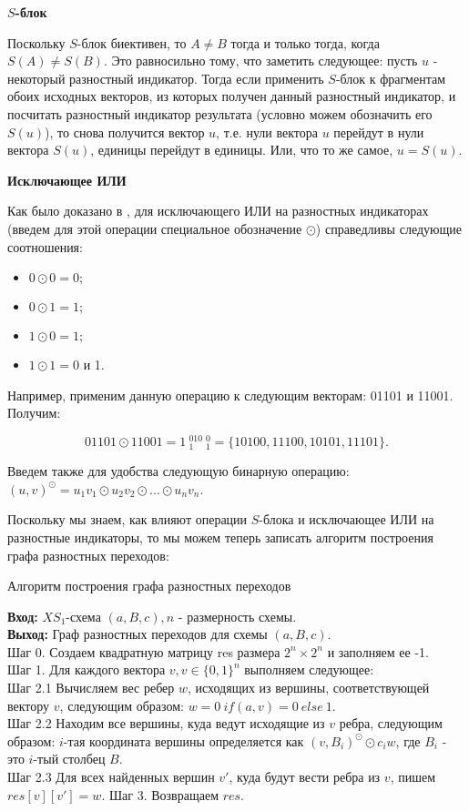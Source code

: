 \documentclass[a4paper,12pt]{report}
\theoremstyle{plain} %
\theoremstyle{definition}
\theoremstyle{remark}
\begin{document}
\begin{large}
\textbf{$S$-блок}

Поскольку $S$-блок биективен, то $A \neq B$ тогда и только тогда, когда $S(A) \neq S(B)$. Это равносильно тому, что заметить следующее: пусть $u$ - некоторый разностный индикатор. Тогда если применить $S$-блок к фрагментам обоих исходных векторов, из которых получен данный разностный индикатор, и посчитать разностный индикатор результата (условно можем обозначить его $S(u)$), то снова получится вектор $u$, т.е. нули вектора $u$ перейдут в нули вектора $S(u)$, единицы перейдут в единицы. Или, что то же самое, $u=S(u)$.

\textbf{Исключающее ИЛИ}

 Как было доказано в \cite{marchuk}, для исключающего ИЛИ на разностных индикаторах (введем для этой операции специальное обозначение $\odot$) справедливы следующие соотношения:

\begin{itemize}
\item $0 \odot 0 = 0;$
\item $0 \odot 1 = 1;$
\item $1 \odot 0= 1;$
\item $1 \odot 1 = 0$ и 1. 
\end{itemize}

Например, применим данную операцию к следующим векторам: 01101 и 11001. Получим:

$$01101 \odot 11001 = 1~_{1}^010~_{1}^0 = \{10100, 11100, 10101, 11101\}.$$

Введем также для удобства следующую бинарную операцию: $(u, v)^{\odot} = u_1v_1 \odot u_2v_2 \odot ... \odot u_nv_n$.

Поскольку мы знаем, как влияют операции $S$-блока и исключающее ИЛИ на разностные индикаторы, то мы можем теперь записать алгоритм построения графа разностных переходов:

\begin{algorithm}[H]
\caption{Алгоритм построения графа разностных переходов}
\label{diff_graph_construct}
\textbf{Вход:} $XS_1$-схема $(a, B, c), n$ - размерность схемы.\\
\textbf{Выход:} Граф разностных переходов для схемы $(a, B, c)$.\\
Шаг 0. Создаем квадратную матрицу res размера $2^n \times 2^n$ и заполняем ее -1. \\
Шаг 1. Для каждого вектора $v, v \in \{0, 1\}^n$ выполняем следующее: \\
Шаг 2.1 Вычисляем вес ребер $w$, исходящих из вершины, соответствующей вектору $v$, следующим образом: $w = 0~ if (a,v) = 0 ~else ~1$.\\
Шаг 2.2 Находим все вершины, куда ведут исходящие из $v$ ребра, следующим образом: $i$-тая координата вершины определяется как $(v, B_i)^{\odot} \odot c_iw$, где $B_i$ - это $i$-тый столбец $B$. \\
Шаг 2.3 Для всех найденных вершин $v'$, куда будут вести ребра из $v$, пишем $res[v][v'] = w$.
Шаг 3. Возвращаем $res$.\\
\end{algorithm}


\end{large}
\end{document}
